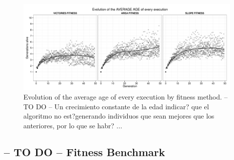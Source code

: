 \documentclass[preprint]{elsarticle}
\begin{document}
 \begin{figure}[ht]
 \begin{center}
   \includegraphics[width=12cm]{nuevas_imgs/evolution_AVERAGE_AGE.pdf}
 \end{center}
 \caption{Evolution of the average age of every execution by fitness
   method. -- TO DO -- Un crecimiento constante de la edad indicar?
   que el algoritmo no est?generando individuos que sean mejores que
   los anteriores, por lo que se habr? ...} %
 \label{figura:evolutionAGE}
 \end{figure}

\begin{table}
\end{table}

\subsection{-- TO DO -- Fitness Benchmark}
\end{document}

